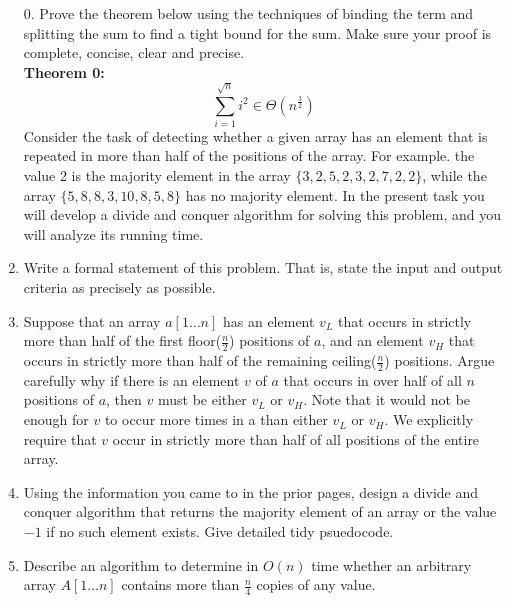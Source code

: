 \documentclass[12pt]{article}
\begin{document}
\begin{enumerate}
\item[0. ] Prove the theorem below using the techniques of binding the term and splitting the
sum to find a tight bound for the sum. Make sure your proof is complete, concise, clear
and precise.\\
\textbf{Theorem 0: }
$$\sum\limits_{i=1}^{\sqrt{n}}i^2 \in\Theta(n^{\frac{3}{2}})$$
\newpage
Consider the task of detecting whether a given array has an element that is repeated in more
than half of the positions of the array. For example. the value 2 is the majority element in
the array $\{3, 2, 5, 2, 3, 2, 7, 2, 2\}$, while the array $\{5, 8, 8, 3, 10, 8, 5, 8\}$ has no majority element.
In the present task you will develop a divide and conquer algorithm for solving this problem,
and you will analyze its running time.\\
\item Write a formal statement of this problem. That is, state the input and
output criteria as precisely as possible.
\newpage
\item  Suppose that an array $a[1 \dots n]$ has an element $v_L$ that occurs in strictly more than half
of the first floor($\frac{n}{2}$) positions of $a$, and an element $v_H$ that occurs in strictly more than half
of the remaining ceiling($\frac{n}{2}$) positions. Argue carefully why if there is an element $v$ of $a$ that
occurs in over half of all $n$ positions of $a$, then $v$ must be either $v_L$ or $v_H$. Note that it
would not be enough for $v$ to occur more times in a than either $v_L$ or $v_H$. We explicitly
require that $v$ occur in strictly more than half of all positions of the entire array.
\newpage
\item Using the information you came to in the prior pages, design a divide and conquer algorithm 
that returns the majority element of an array or the value $-1$ if no such element exists. 
Give detailed tidy psuedocode.
\newpage
\item Describe an algorithm to determine in $O(n)$ time whether 
an arbitrary array $A[1 \dots n]$ contains more than $\frac{n}{4}$
copies of any value.
\end{enumerate}
\end{document}
